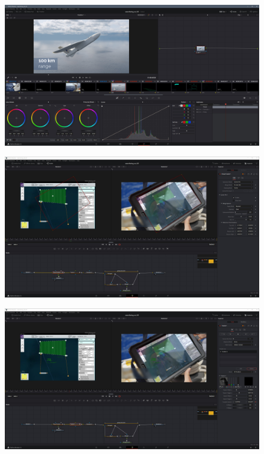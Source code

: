 \begin{figure}[H]
\begin{center}
\includegraphics[width=\textwidth]{gfx/post/resolve7.jpg}
\caption{}
\label{resolve7}
\end{center}
\end{figure}

\begin{figure}[H]
\begin{center}
\includegraphics[width=\textwidth]{gfx/post/resolve8.jpg}
\caption{}
\label{resolve8}
\end{center}
\end{figure}

\begin{figure}[H]
\begin{center}
\includegraphics[width=\textwidth]{gfx/post/resolve9.jpg}
\caption{}
\label{resolve9}
\end{center}
\end{figure}

